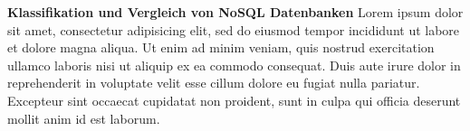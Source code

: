 \textbf{Klassifikation und Vergleich von NoSQL Datenbanken\newline}
Lorem ipsum dolor sit amet, consectetur adipisicing elit, sed do eiusmod
tempor incididunt ut labore et dolore magna aliqua. Ut enim ad minim veniam,
quis nostrud exercitation ullamco laboris nisi ut aliquip ex ea commodo
consequat. Duis aute irure dolor in reprehenderit in voluptate velit esse
cillum dolore eu fugiat nulla pariatur. Excepteur sint occaecat cupidatat non
proident, sunt in culpa qui officia deserunt mollit anim id est laborum. \nextline

\clearpage %